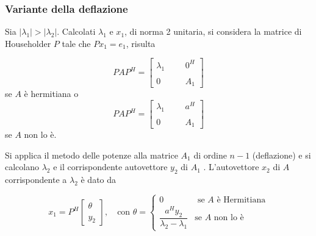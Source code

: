 




\subsubsection{Variante della deflazione}
Sia $|\lambda_1 | > |\lambda_2 |$. Calcolati $\lambda_1$ e $x_1$, di norma 2
unitaria, si considera la matrice di Householder $P$ tale che
$ Px_1 = e_1 $, risulta

$$
PAP^{H} =
\left[
  \begin{array}{llll}
    \lambda_1 &  &  & 0^{H} \\
              &  &  &       \\
    0         &  &  & A_1
  \end{array}
\right]
$$
se $A$ \`e hermitiana o
$$
PAP^{H} =
\left[
  \begin{array}{llll}
    \lambda_1 &  &  & a^{H} \\
              &  &  &       \\
    0         &  &  & A_1
  \end{array}
\right]
$$
se $A$ non lo \`e.

Si applica il metodo delle potenze alla matrice $A_1$ di ordine $n -
1$ (deflazione) e si calcolano $\lambda_2$ e il corrispondente
autovettore $y_2$ di $A_1$ .  L'autovettore $x_2$ di $A$
corrispondente a $\lambda_2$ \`e dato da

$$
x_1 = P^{H}
\left[
  \begin{array}{l}
    \theta \\
    \\
    y_2
  \end{array}
\right]
,
\quad
\text{con } \theta=\left\{
  \begin{array}{ll}
    0 & \text{ se } A \text{ \`e Hermitiana} \\
    \dfrac{a^{H}y_2}{\lambda_2 - \lambda_1} & \text{se } A \text{ non lo \`e}
  \end{array}
\right.
$$

